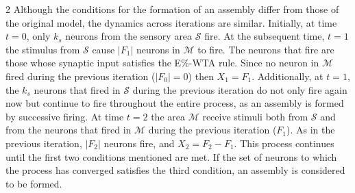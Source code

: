 \documentclass[a4paper, 10pt]{article}
\begin{document}
\begin{multicols}{2}
Although the conditions for the formation of an assembly differ from those of the original model, the dynamics across iterations are similar. Initially, at time $t = 0$, only $k_{s}$ neurons from the sensory area $\mathcal{S}$ fire. At the subsequent time, $t = 1$ the stimulus from $\mathcal{S}$ cause $\left|F_{1}\right|$ neurons in $\mathcal{M}$ to fire. The neurons that  fire are those whose synaptic input satisfies the E\%-WTA rule. Since no neuron in  $\mathcal{M}$ fired during the previous iteration ($|F_{0}| = 0$) then $X_{1} = F_{1}$. Additionally, at $t = 1$, the $k_{s}$ neurons that fired in $\mathcal{S}$ during the previous iteration do not only fire again now but continue to fire throughout the entire process, as an assembly is formed by successive firing. At time $t = 2$ the area $\mathcal{M}$ receive stimuli both from $\mathcal{S}$ and from the neurons that fired in $\mathcal{M}$ during the previous iteration ($F_{1}$). As in the previous iteration, $\left|F_{2}\right|$ neurons fire, and $X_{2} = F_{2} - F_{1}$. This process continues until the first two conditions mentioned are met. If the set of neurons to which the process has converged satisfies the third condition, an assembly is considered to be formed.\newline


\end{multicols}
\end{document}
